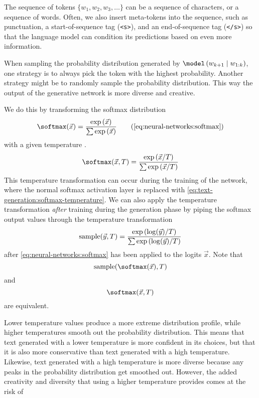 The sequence of tokens $\{w_1, w_2, w_3, \dots\}$ can be a sequence of characters, or a sequence of words.
Often, we also insert meta-tokens into the sequence, such as punctuation, a start-of-sequence tag (\verb|<s>|), and an end-of-sequence tag (\verb|</s>|) so that the language model can condition its predictions based on even more information.

When sampling the probability distribution generated by $\model\left(w_{k+1} \mid w_{1:k}\right)$, one strategy is to always pick the token with the highest probability.
Another strategy might be to randomly sample the probability distribution.
This way the output of the generative network is more diverse and creative.

We do this by transforming the softmax distribution
\begin{equation}
    \softmax(\vec x) = \frac{\exp\left(\vec x\right)}{\sum\exp\left(\vec x\right)} \tag{\ref{eq:neural-networks:softmax}}
\end{equation}
with a given temperature \cite{hinton2015distilling}.
\begin{equation}
    \softmax(\vec x, T) = \frac{\exp\left(\vec x \middle/ T \right)}{\sum\exp\left(\vec x \middle/ T\right)} \label{eq:text-generation:softmax-temperature}
\end{equation}
This temperature transformation can occur during the training of the network, where the normal softmax activation layer is replaced with \autoref{eq:text-generation:softmax-temperature}.
We can also apply the temperature transformation \textit{after} training during the generation phase by piping the softmax output values through the temperature transformation
\begin{equation}
    \operatorname{sample}(\vec y, T) = \frac{\exp\left(\log(\vec y) \middle/ T\right)}{\sum\exp\left(\log(\vec y) \middle/ T\right)}\label{eq:text-generation:temperature-sampling}
\end{equation}
after \autoref{eq:neural-networks:softmax} has been applied to the logits $\vec x$.
Note that \[\operatorname{sample}(\softmax(\vec x), T)\] and \[\softmax(\vec x, T)\] are equivalent.

Lower temperature values produce a more extreme distribution profile, while higher temperatures smooth out the probability distribution.
This means that text generated with a lower temperature is more confident in its choices, but that it is also more conservative than text generated with a high temperature.
Likewise, text generated with a high temperature is more diverse because any peaks in the probability distribution get smoothed out.
However, the added creativity and diversity that using a higher temperature provides comes at the risk of 

